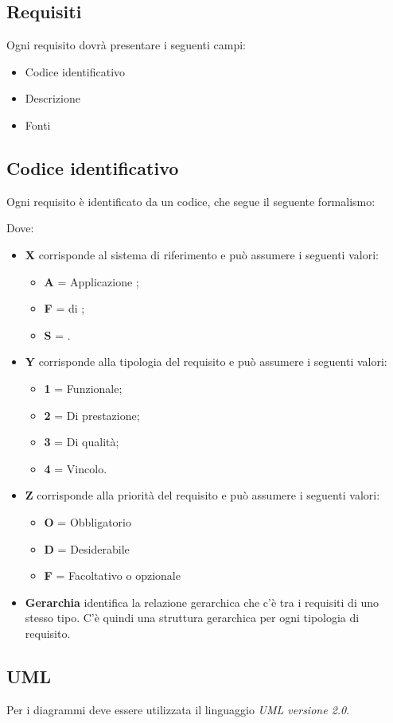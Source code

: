 \subsection{Requisiti}

Ogni requisito dovrà presentare i seguenti campi:
\begin{itemize}
 \item Codice identificativo
 \item Descrizione
 \item Fonti
\end{itemize}

\subsection{Codice identificativo}

Ogni requisito è identificato da un codice, che segue il seguente formalismo:
\begin{center}
\end{center}

Dove:
\begin{itemize}
 \item \textbf{X} corrisponde al sistema di riferimento e può assumere i seguenti valori:
	\begin{itemize}
	 \item[] \textbf{A} = Applicazione ;
	 \item[] \textbf{F} =  di ;
	 \item[] \textbf{S} = .
	\end{itemize}

 \item \textbf{Y} corrisponde alla tipologia del requisito e può assumere i seguenti valori:
	\begin{itemize}
	 \item[] \textbf{1} = Funzionale;
	 \item[] \textbf{2} = Di prestazione;
	 \item[] \textbf{3} = Di qualità;
	 \item[] \textbf{4} = Vincolo.
	\end{itemize}

 \item \textbf{Z} corrisponde alla priorità del requisito e può assumere i seguenti valori:
	\begin{itemize}
	 \item[] \textbf{O} = Obbligatorio
	 \item[] \textbf{D} = Desiderabile
	 \item[] \textbf{F} = Facoltativo o opzionale
	\end{itemize}

 \item \textbf{Gerarchia} identifica la relazione gerarchica che c'è tra i requisiti di uno stesso tipo. C'è quindi una struttura gerarchica per ogni tipologia di requisito.
\end{itemize}



\subsection{UML}

Per i diagrammi deve essere utilizzata il linguaggio \emph{UML versione 2.0}.